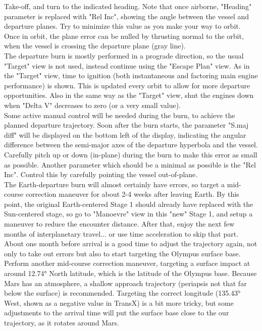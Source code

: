 \documentclass[Orbiter User Manual.tex]{subfiles}
\begin{document}
Take-off, and turn to the indicated heading. Note that once airborne, "Heading" parameter is replaced with "Rel Inc", showing the angle between the vessel and departure planes. Try to minimize this value as you make your way to orbit. Once in orbit, the plane error can be nulled by thrusting normal to the orbit, when the vessel is crossing the departure plane (gray line).\\
The departure burn is mostly performed in a prograde direction, so the usual "Target" view is not used, instead continue using the "Escape Plan" view. As in the "Target" view, time to ignition (both instantaneous and factoring main engine performance) is shown. This is updated every orbit to allow for more departure opportunities. Also in the same way as the "Target" view, shut the engines down when "Delta V" decreases to zero (or a very small value).\\
Some active manual control will be needed during the burn, to achieve the planned departure trajectory. Soon after the burn starts, the parameter "S.maj diff" will be displayed on the bottom left of the display, indicating the angular difference between the semi-major axes of the departure hyperbola and the vessel. Carefully pitch up or down (in-plane) during the burn to make this error as small as possible. Another parameter which should be a minimal as possible is the "Rel Inc". Control this by carefully pointing the vessel out-of-plane.\\
The Earth-departure burn will almost certainly have errors, so target a mid-course correction maneuver for about 2-4 weeks after leaving Earth. By this point, the original Earth-centered Stage 1 should already have replaced with the Sun-centered stage, so go to "Manoevre" view in this "new" Stage 1, and setup a maneuver to reduce the encounter distance. After that, enjoy the next few months of interplanetary travel... or use time acceleration to skip that part.\\
About one month before arrival is a good time to adjust the trajectory again, not only to take out errors but also to start targeting the Olympus surface base. Perform another mid-course correction maneuver, targeting a surface impact at around 12.74° North latitude, which is the latitude of the Olympus base. Because Mars has an atmosphere, a shallow approach trajectory (periapsis not that far below the surface) is recommended. Targeting the correct longitude (135.43° West, shown as a negative value in TransX) is a bit more tricky, but some adjustments to the arrival time will put the surface base close to the our trajectory, as it rotates around Mars.\\
\end{document}
